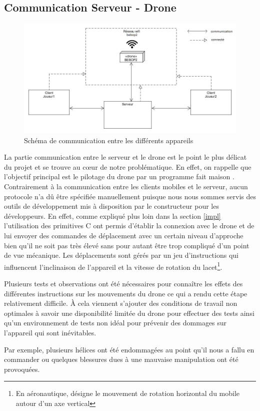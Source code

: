 \subsection{Communication Serveur - Drone}

\begin{figure}[ht]
\begin{center}
\includegraphics[scale=0.45]{images/architecture.jpg}
\caption{Schéma de communication entre les différents appareils}
\end{center}
\end{figure}

La partie communication entre le serveur et le drone est le point le plus délicat du projet et se trouve au c\oe{}ur de notre problématique. En effet, on rappelle que l'objectif principal est le pilotage du drone par un programme \og fait maison \fg{}. Contrairement à la communication entre les clients mobiles et le serveur, aucun protocole n'a dû être spécifiée manuellement puisque nous nous sommes servis des outils de développement mis à disposition par le constructeur pour les développeurs. En effet, comme expliqué plus loin dans la section \ref{impl} l'utilisation des primitives C ont permis d'établir la connexion avec le drone et de lui envoyer des commandes de déplacement avec un certain niveau d'approche bien qu'il ne soit pas très élevé sans pour autant être trop compliqué d'un point de vue mécanique. Les déplacements sont gérés par un jeu d'instructions qui influencent l'inclinaison de l'appareil et la vitesse de rotation du lacet\footnote{En aéronautique, désigne le mouvement de rotation horizontal du mobile autour d'un axe vertical}. 

Plusieurs tests et observations ont été nécessaires pour connaître les effets des différentes instructions sur les mouvements du drone ce qui a rendu cette étape relativement difficile. À cela viennent s'ajouter des conditions de travail non optimales à savoir une disponibilité limitée du drone pour effectuer des tests ainsi qu'un environnement de tests non idéal pour prévenir des dommages sur l'appareil qui sont inévitables.

Par exemple, plusieurs hélices ont été endommagées au point qu'il nous a fallu en commander ou quelques blessures dues à une mauvaise manipulation ont été provoquées.

